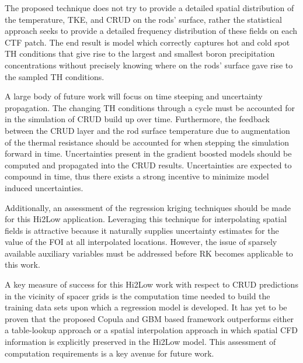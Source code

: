 
The proposed technique does not try to provide a detailed spatial distribution
of the temperature, TKE, and CRUD on the rods' surface, rather the
statistical approach seeks to provide a detailed frequency distribution
of these fields on each CTF patch.  The end result is model which correctly captures hot and cold
spot TH conditions that give rise to the largest and smallest boron
precipitation concentrations without precisely knowing where on the rods'
surface gave rise to the sampled TH conditions.

A large body of future work will focus on time steeping and uncertainty propagation.
The changing TH conditions through a cycle must be accounted for in the simulation of CRUD build up over time.  Furthermore, the feedback between the CRUD layer and the rod surface temperature due to augmentation of the thermal resistance should be accounted for when stepping the simulation forward in time.
Uncertainties present in the gradient boosted models should be computed and
propagated into the CRUD results.   Uncertainties are expected to compound in time, thus there exists a strong incentive to minimize model induced uncertainties.

Additionally, an assessment of the regression kriging techniques should be made for this Hi2Low application.  Leveraging this technique for interpolating spatial fields is attractive because it naturally supplies uncertainty estimates for the value of the FOI at all interpolated locations.  However, the issue of sparsely available auxiliary variables must be addressed before RK becomes applicable to this work.

A key measure of success for this Hi2Low work with respect to  CRUD predictions
in the vicinity of spacer grids is the computation time needed to build the
training data sets upon which a regression model is developed.
It has yet to be proven that the proposed Copula and GBM based framework outperforms
either a table-lookup approach or a spatial interpolation approach in which
spatial CFD information is explicitly preserved in the Hi2Low model.  This assessment
of computation requirements is a key avenue for future work.